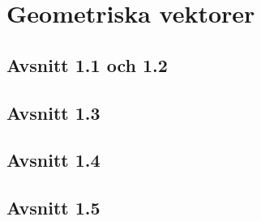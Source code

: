 \section{Geometriska vektorer}
\subsection*{Avsnitt 1.1 och 1.2}



\subsection*{Avsnitt 1.3}


\subsection*{Avsnitt 1.4}



\subsection*{Avsnitt 1.5}





